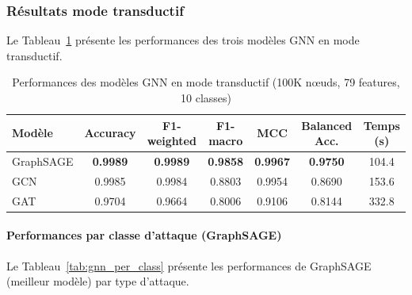 ﻿\documentclass[11pt,a4paper]{article}
\begin{document}
\subsubsection{Résultats mode transductif}

Le Tableau~\ref{tab:gnn_transductif} présente les performances des trois modèles GNN en mode transductif.

\begin{table}[htbp]
\centering
\caption{Performances des modèles GNN en mode transductif (100K nœuds, 79 features, 10 classes)}
\label{tab:gnn_transductif}
\begin{tabular}{lcccccc}
\toprule
\textbf{Modèle} & \textbf{Accuracy} & \textbf{F1-weighted} & \textbf{F1-macro} & \textbf{MCC} & \textbf{Balanced Acc.} & \textbf{Temps (s)} \\
\midrule
GraphSAGE & \textbf{0.9989} & \textbf{0.9989} & \textbf{0.9858} & \textbf{0.9967} & \textbf{0.9750} & 104.4 \\
GCN       & 0.9985 & 0.9984 & 0.8803 & 0.9954 & 0.8690 & 153.6 \\
GAT       & 0.9704 & 0.9664 & 0.8006 & 0.9106 & 0.8144 & 332.8 \\
\bottomrule
\end{tabular}
\end{table}

\paragraph{Performances par classe d'attaque (GraphSAGE)}

Le Tableau~\ref{tab:gnn_per_class} présente les performances de GraphSAGE (meilleur modèle) par type d'attaque.
\end{document}

